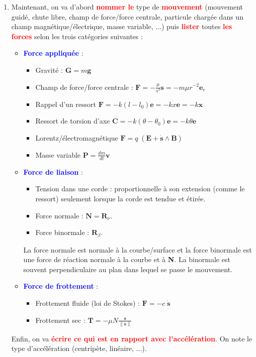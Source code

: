 \documentclass[a4paper]{article}
\begin{document}
\begin{enumerate}
\item Maintenant, on va d'abord \textcolor{red}{\textbf{nommer le}} type de \textcolor{red}{\textbf{mouvement}} (mouvement guidé, chute libre, champ de force/force centrale, particule chargée dans un champ magnétique/électrique, masse variable, ...) puis \textcolor{red}{\textbf{lister}} toutes \textcolor{red}{\textbf{les forces}} selon les trois catégories suivantes : 
\begin{itemize}
\item \textcolor{blue}{\textbf{Force appliquée}} : 
    \begin{itemize}
    \item Gravité : $ \textbf{G} = m \textbf{g} $
    \item Champ de force/force centrale : $\displaystyle \textbf{F} = - \frac{\mu}{s^3} \textbf{s} = - m \mu r^{-2} \textbf{e}_r $
    \item Rappel d'un ressort $ \textbf{F} = - k (l - l_0) \textbf{e} = - k x \textbf{e} = - k \textbf{x} $
    \item Ressort de torsion d'axe $ \textbf{C} = - k (\theta - \theta_0) \textbf{e} = - k \theta \textbf{e} $
    \item Lorentz/électromagnétique $ \textbf{F} = q \; (\textbf{E} + \dot{\textbf{s}} \wedge \textbf{B}) $
    \item Masse variable $\displaystyle \textbf{P} = \frac{d m}{d t} \textbf{v} $
    \end{itemize}
\item \textcolor{blue}{\textbf{Force de liaison}} : 
    \begin{itemize}
    \item Tension dans une corde : proportionnelle à son extension (comme le ressort) seulement lorsque la corde est tendue et étirée.
    \item Force normale : $ \textbf{N} = \textbf{R}_\nu $.
    \item Force binormale : $ \textbf{R}_\beta $.
    \end{itemize}
La force normale est normale à la courbe/surface et la force binormale est une force de réaction normale à la courbe et à \textbf{N}. La binormale est souvent perpendiculaire au plan dans lequel se passe le mouvement.
\item \textcolor{blue}{\textbf{Force de frottement}} : 
    \begin{itemize}
    \item Frottement fluide (loi de Stokes) : $ \textbf{F} = - c \; \dot{\textbf{s}} $
    \item Frottement sec : $\displaystyle \textbf{T} = - \mu N \frac{\dot{\textbf{s}}}{\| \dot{\textbf{s}} \|} $
    \end{itemize}
\end{itemize}
Enfin, on va \textcolor{red}{\textbf{écrire ce qui est en rapport avec l'accélération}}. On note le type d'accélération (centripète, linéaire, ...).






\end{enumerate}
\end{document}
